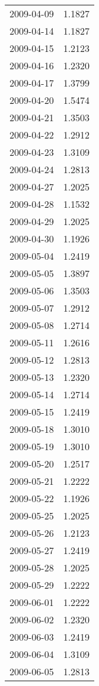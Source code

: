 \begin{tabular}{lr}
2009-04-09 &      1.1827 \\
2009-04-14 &      1.1827 \\
2009-04-15 &      1.2123 \\
2009-04-16 &      1.2320 \\
2009-04-17 &      1.3799 \\
2009-04-20 &      1.5474 \\
2009-04-21 &      1.3503 \\
2009-04-22 &      1.2912 \\
2009-04-23 &      1.3109 \\
2009-04-24 &      1.2813 \\
2009-04-27 &      1.2025 \\
2009-04-28 &      1.1532 \\
2009-04-29 &      1.2025 \\
2009-04-30 &      1.1926 \\
2009-05-04 &      1.2419 \\
2009-05-05 &      1.3897 \\
2009-05-06 &      1.3503 \\
2009-05-07 &      1.2912 \\
2009-05-08 &      1.2714 \\
2009-05-11 &      1.2616 \\
2009-05-12 &      1.2813 \\
2009-05-13 &      1.2320 \\
2009-05-14 &      1.2714 \\
2009-05-15 &      1.2419 \\
2009-05-18 &      1.3010 \\
2009-05-19 &      1.3010 \\
2009-05-20 &      1.2517 \\
2009-05-21 &      1.2222 \\
2009-05-22 &      1.1926 \\
2009-05-25 &      1.2025 \\
2009-05-26 &      1.2123 \\
2009-05-27 &      1.2419 \\
2009-05-28 &      1.2025 \\
2009-05-29 &      1.2222 \\
2009-06-01 &      1.2222 \\
2009-06-02 &      1.2320 \\
2009-06-03 &      1.2419 \\
2009-06-04 &      1.3109 \\
2009-06-05 &      1.2813 \\

\end{tabular}
